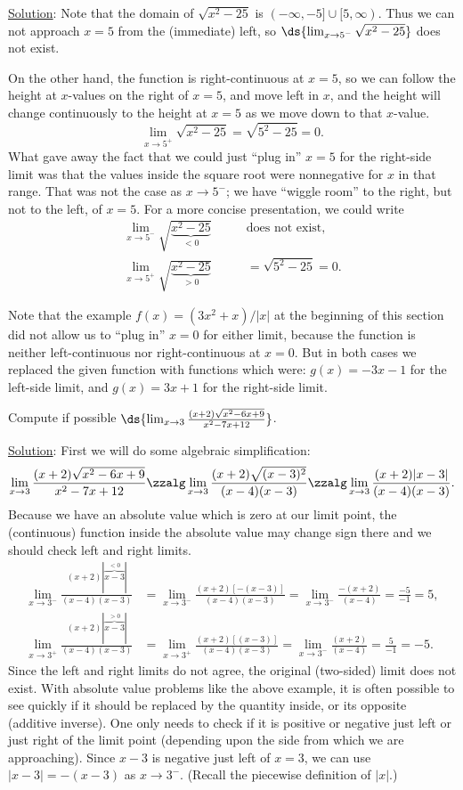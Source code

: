 \underline{Solution}:
Note that the domain of $\sqrt{x^2-25}$ is $(-\infty,-5]\cup[5,\infty)$.
Thus we can not approach $x=5$ from the (immediate) left, so
$\ds{\lim_{x\to5^-}\sqrt{x^2-25}}$ does not exist.


On the other hand, the function is right-continuous at $x=5$,
so we can follow the height at $x$-values
on the right of $x=5$, and move left in $x$, and the
height will change  continuously 
to the height at $x=5$ as we move down to that $x$-value.  
$$\lim_{x\to5^+}\sqrt{x^2-25}=\sqrt{5^2-25}=0.$$
\eex
What gave away the fact that we could just ``plug in'' $x=5$
for the right-side limit was that the values inside the
square root were nonnegative for $x$ in that range.
That was not the case as $x\to5^-$; we have ``wiggle room''
to the right, but not to the left, of $x=5$.  For a more 
concise presentation, we could write
\begin{align*}\lim_{x\to5^-}\sqrt{\underbrace{x^2-25}_{<0}}\qquad&\text{does
not exist},\\
\lim_{x\to5^+}\sqrt{\underbrace{x^2-25}_{>0}}\qquad&
=\sqrt{5^2-25}=0.
\end{align*}





Note that the example $f(x)=(3x^2+x)/|x|$ at the beginning
of this section
did not allow us to ``plug in'' $x=0$ for either limit, because
the function is neither left-continuous nor right-continuous
at $x=0$.  But in both cases we replaced the given function
with functions which were: $g(x)=-3x-1$ for the left-side
limit, and $g(x)=3x+1$ for the right-side limit.

\bex Compute if possible
 $\ds{\lim_{x\to3}\frac{(x+2)\sqrt{x^2-6x+9}}{x^2-7x+12}}$.

\underline{Solution}:
First we will do some algebraic simplification:
$$\lim_{x\to3}\frac{(x+2)\sqrt{x^2-6x+9}}{x^2-7x+12}
\zzalg
\lim_{x\to3}\frac{(x+2)\sqrt{(x-3)^2}}{(x-4)(x-3)}
\zzalg
\lim_{x\to3}\frac{(x+2)|x-3|}{(x-4)(x-3)}.
$$
Because we have an absolute value which is zero at our limit point,
the (continuous) function inside the absolute value
 may change sign there and we should check
left and right limits.
\begin{align*}
\lim_{x\to3^-}\frac{(x+2)|\overbrace{x-3}^{<0}|}{(x-4)(x-3)}
&=\lim_{x\to3^-}\frac{(x+2)[-(x-3)]}{(x-4)(x-3)}
=\lim_{x\to3^-}\frac{-(x+2)}{(x-4)}=\frac{-5}{-1}=5,\\
\lim_{x\to3^+}\frac{(x+2)|\overbrace{x-3}^{>0}|}{(x-4)(x-3)}
&=\lim_{x\to3^+}\frac{(x+2)[(x-3)]}{(x-4)(x-3)}
=\lim_{x\to3^-}\frac{(x+2)}{(x-4)}=\frac{5}{-1}=-5.
\end{align*}
Since the left and right limits do not agree, the original
(two-sided) limit does not exist.
\eex
With absolute value problems like the above example,
it is often possible to see quickly if it should be
replaced by the quantity inside, or its opposite
(additive inverse).  One only needs to check if it is
positive or negative just left or just right of the
limit point
(depending upon the side from which we are approaching).
Since $x-3$ is negative just left of $x=3$, we
can use $|x-3|=-(x-3)$ as $x\to3^-$. (Recall the piecewise
definition of $|x|$.)

